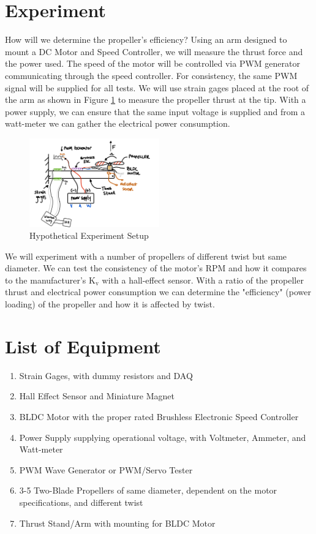 \documentclass{article}
\begin{document}
\section{Experiment}
How will we determine the propeller's efficiency? Using an arm designed to mount a DC Motor and Speed Controller, we will measure the thrust force and the power used. The speed of the motor will be controlled via PWM generator communicating through the speed controller. For consistency, the same PWM signal will be supplied for all tests. We will use strain gages placed at the root of the arm as shown in Figure \ref{fig:finalsetup} to measure the propeller thrust at the tip. With a power supply, we can ensure that the same input voltage is supplied and from a watt-meter we can gather the electrical power consumption.
\begin{figure}[H]
    \centering
    \includegraphics[width = 0.5\textwidth]{EMech_FinalExperiment_IdeaSetup_Updated.png}
    \caption{Hypothetical Experiment Setup}
    \label{fig:finalsetup}
\end{figure}
We will experiment with a number of propellers of different twist but same diameter. We can test the consistency of the motor's RPM and how it compares to the manufacturer's $\text{K}_{\text{v}}$ with a hall-effect sensor. With a ratio of the propeller thrust and electrical power consumption we can determine the "efficiency" (power loading) of the propeller and how it is affected by twist. 
\section{List of Equipment}
\begin{enumerate}
    \item Strain Gages, with dummy resistors and DAQ
    \item Hall Effect Sensor and Miniature Magnet
    \item BLDC Motor with the proper rated Brushless Electronic Speed Controller 
    \item Power Supply supplying operational voltage, with Voltmeter, Ammeter, and Watt-meter
    \item PWM Wave Generator or PWM/Servo Tester
    \item 3-5 Two-Blade Propellers of same diameter, dependent on the motor specifications, and different twist 
    \item Thrust Stand/Arm with mounting for BLDC Motor
\end{enumerate}
\end{document}
